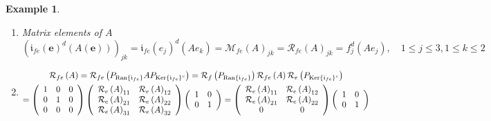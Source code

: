 \documentclass[aps,preprint]{revtex4}%
\newtheorem{example}[theorem]{Example}
\begin{document}
\begin{example}
\begin{enumerate}
\begin{enumerate}
\item Matrix elements of $A\ $%
\begin{equation}
\left(  \overset{}{\mathfrak{i}_{fe}\left(  \mathbf{e}\right)  ^{d}\left(
A\left(  \mathbf{e}\right)  \right)  }\right)  _{jk}=\mathfrak{i}_{fe}\left(
e_{j}\right)  ^{d}\left(  \overset{}{Ae_{k}}\right)  =\mathcal{M}_{fe}\left(
A\right)  _{jk}=\mathcal{R}_{fe}\left(  A\right)  _{jk}=f_{j}^{d}\left(
Ae_{j}\right)  ,\quad1\leq j\leq3,1\leq k\leq2
\end{equation}


\item
\begin{gather}
\mathcal{R}_{fe}\left(  A\right)  =\mathcal{R}_{fe}\left(
P_{\operatorname{Ran}\left\{  \mathfrak{i}_{fe}\right\}  }%
AP_{\operatorname{Ker}\left\{  \mathfrak{i}_{fe}\right\}  ^{c}}\right)
=\mathcal{R}_{f}\left(  P_{\operatorname{Ran}\left\{  \mathfrak{i}%
_{fe}\right\}  }\right)  \mathcal{R}_{fe}\left(  A\right)  \mathcal{R}%
_{e}\left(  P_{\operatorname{Ker}\left\{  \mathfrak{i}_{fe}\right\}  ^{c}%
}\right) \\
=\left(
\begin{array}
[c]{ccc}%
1 & 0 & 0\\
0 & 1 & 0\\
0 & 0 & 0
\end{array}
\right)  \left(
\begin{array}
[c]{cc}%
\mathcal{R}_{e}\left(  A\right)  _{11} & \mathcal{R}_{e}\left(  A\right)
_{12}\\
\mathcal{R}_{e}\left(  A\right)  _{21} & \mathcal{R}_{e}\left(  A\right)
_{22}\\
\mathcal{R}_{e}\left(  A\right)  _{31} & \mathcal{R}_{e}\left(  A\right)
_{32}%
\end{array}
\right)  \left(
\begin{array}
[c]{cc}%
1 & 0\\
0 & 1
\end{array}
\right)  =\left(
\begin{array}
[c]{cc}%
\mathcal{R}_{e}\left(  A\right)  _{11} & \mathcal{R}_{e}\left(  A\right)
_{12}\\
\mathcal{R}_{e}\left(  A\right)  _{21} & \mathcal{R}_{e}\left(  A\right)
_{22}\\
0 & 0
\end{array}
\right)  \left(
\begin{array}
[c]{cc}%
1 & 0\\
0 & 1
\end{array}
\right) \\

\end{gather}
\end{enumerate}
\end{enumerate}
\end{example}
\end{document}
